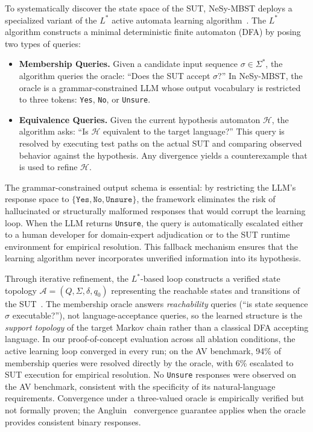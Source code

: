 To systematically discover the state space of the SUT, NeSy-MBST deploys a specialized variant of the $L^{*}$ active automata learning algorithm~\cite{angluin1987,lstar_llm}. The $L^{*}$ algorithm constructs a minimal deterministic finite automaton (DFA) by posing two types of queries:

\begin{itemize}
    \item \textbf{Membership Queries.} Given a candidate input sequence $\sigma \in \Sigma^{*}$, the algorithm queries the oracle: ``Does the SUT accept $\sigma$?'' In NeSy-MBST, the oracle is a grammar-constrained LLM whose output vocabulary is restricted to three tokens: \texttt{Yes}, \texttt{No}, or \texttt{Unsure}.

    \item \textbf{Equivalence Queries.} Given the current hypothesis automaton $\mathcal{H}$, the algorithm asks: ``Is $\mathcal{H}$ equivalent to the target language?'' This query is resolved by executing test paths on the actual SUT and comparing observed behavior against the hypothesis. Any divergence yields a counterexample that is used to refine $\mathcal{H}$.
\end{itemize}

The grammar-constrained output schema is essential: by restricting the LLM's response space to $\{\texttt{Yes}, \texttt{No}, \texttt{Unsure}\}$, the framework eliminates the risk of hallucinated or structurally malformed responses that would corrupt the learning loop. When the LLM returns \texttt{Unsure}, the query is automatically escalated either to a human developer for domain-expert adjudication or to the SUT runtime environment for empirical resolution. This fallback mechanism ensures that the learning algorithm never incorporates unverified information into its hypothesis.

Through iterative refinement, the $L^{*}$-based loop constructs a verified state topology $\mathcal{A} = (Q, \Sigma, \delta, q_0)$ representing the reachable states and transitions of the SUT~\cite{lstar_llm}.  The membership oracle answers \emph{reachability} queries (``is state sequence $\sigma$ executable?''), not language-acceptance queries, so the learned structure is the \emph{support topology} of the target Markov chain rather than a classical DFA accepting language.  In our proof-of-concept evaluation across all ablation conditions, the active learning loop converged in every run; on the AV benchmark, 94\% of membership queries were resolved directly by the oracle, with 6\% escalated to SUT execution for empirical resolution.  No \texttt{Unsure} responses were observed on the AV benchmark, consistent with the specificity of its natural-language requirements.  Convergence under a three-valued oracle is empirically verified but not formally proven; the Angluin~\cite{angluin1987} convergence guarantee applies when the oracle provides consistent binary responses.

